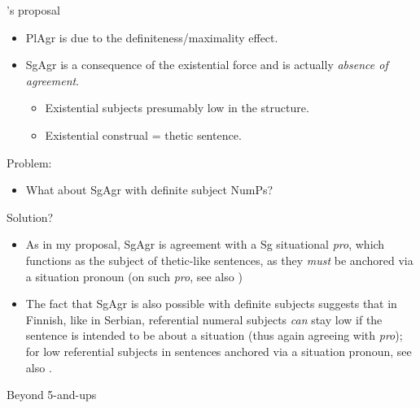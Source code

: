 \citet{Kaiser2022salt}'s proposal
\begin{itemize}
    \item PlAgr is due to the definiteness/maximality effect.
    \item SgAgr is a consequence of the existential force and is actually \textit{absence of agreement}.
    \begin{itemize}
        \item Existential subjects presumably low in the structure.
        \item Existential construal = thetic sentence.
    \end{itemize}
    \bigbreak
\end{itemize}
Problem:
\begin{itemize}
    \item What about SgAgr with definite subject NumPs?
\end{itemize}

Solution?
\begin{itemize}
    \item As in my proposal, SgAgr is agreement with a Sg situational \textit{pro}, which functions as the subject of thetic-like sentences, as they \textit{must} be anchored via a situation pronoun (on such \textit{pro}, see also \citealt{Erteschik-Shir1997, Basilico2003, Hinterholzl2019, Hinterholzl2024subjects, Hinterholzl2024es}) 
    \item The fact that SgAgr is also possible with definite subjects suggests that in Finnish, like in Serbian, referential numeral subjects \textit{can} stay low if the sentence is intended to be about a situation (thus again agreeing with \textit{pro}); for low referential subjects in sentences anchored via a situation pronoun, see also \citet{Hinterholzl2019, Hinterholzl2024es, Hinterholzl2024subjects}.
\end{itemize}

Beyond 5-and-ups

